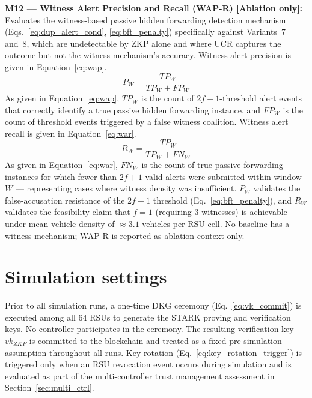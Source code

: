 \documentclass[12pt, a4paper]{report}
\begin{document}
{{%

\textbf{M12 — Witness Alert Precision and Recall
(WAP-R) [Ablation only]:}
Evaluates the witness-based passive hidden
forwarding detection mechanism
(Eqs.~\ref{eq:dup_alert_cond},
\ref{eq:bft_penalty}) specifically against
Variants~7 and~8, which are undetectable by
ZKP alone and where UCR captures the outcome
but not the witness mechanism's accuracy.
Witness alert precision is given in
Equation~\eqref{eq:wap}.
\begin{equation}
P_W =
\frac{TP_W}{TP_W + FP_W}
\label{eq:wap}
\end{equation}
As given in Equation~\eqref{eq:wap},
$TP_W$ is the count of $2f{+}1$-threshold
alert events that correctly identify a true
passive hidden forwarding instance, and
$FP_W$ is the count of threshold events
triggered by a false witness coalition.
Witness alert recall is given in
Equation~\eqref{eq:war}.
\begin{equation}
R_W =
\frac{TP_W}{TP_W + FN_W}
\label{eq:war}
\end{equation}
As given in Equation~\eqref{eq:war},
$FN_W$ is the count of true passive
forwarding instances for which fewer than
$2f{+}1$ valid alerts were submitted
within window $W$ — representing cases
where witness density was insufficient.
$P_W$ validates the false-accusation
resistance of the $2f{+}1$ threshold
(Eq.~\ref{eq:bft_penalty}), and $R_W$
validates the feasibility claim that
$f{=}1$ (requiring 3 witnesses) is
achievable under mean vehicle density of
$\approx 3.1$ vehicles per RSU cell. No
baseline has a witness mechanism;
WAP-R is reported as ablation context only.




\section{Simulation settings}

Prior to all simulation runs, a one-time \ac{DKG}
ceremony (Eq.~\ref{eq:vk_commit}) is executed among
all 64 RSUs to generate the \ac{STARK} proving and
verification keys. No controller participates in the
ceremony. The resulting verification key $vk_{ZKP}$
is committed to the blockchain and treated as a fixed
pre-simulation assumption throughout all runs.
Key rotation (Eq.~\ref{eq:key_rotation_trigger}) is
triggered only when an RSU revocation event occurs
during simulation and is evaluated as part of the
multi-controller trust management assessment in
Section~\ref{sec:multi_ctrl}.

}}
\end{document}
